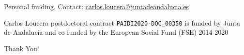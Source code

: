 \documentclass[compress,ignorenonframetext,aspectratio=1610]{beamer}
\begin{document}
	\begin{frame}{Personal funding. Contact: \url{carlos.loucera@juntadeandalucia.es}}


		\vspace{0.3cm}

		Carlos Loucera postdoctoral contract \texttt{PAIDI2020-DOC\_00350} is funded by Junta de Andalucía and co-funded by the European Social Fund (FSE) 2014-2020

		\vspace{0.3cm}

		\begin{center}
		\end{center}
	\end{frame}

	\begin{frame}
		\vspace*{-1pt}
	\end{frame}

	\begin{frame}{}
		\begin{center}
			{\fontsize{40}{50}\selectfont Thank You!}
		\end{center}
	\end{frame}
\end{document}
